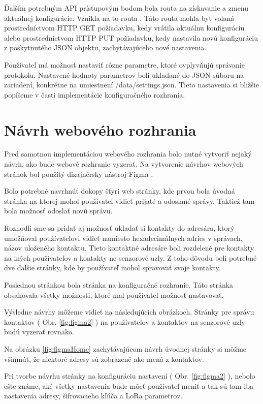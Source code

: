 \documentclass[slovak,master]{diploma}
\begin{document}
Ďalším potrebným API prístupovým bodom bola routa na získavanie a zmenu aktuálnej konfigurácie. 
Vznikla na to routa . Táto routa mohla byť volaná prostredníctvom HTTP GET požiadavku, kedy vrátila aktuálnu konfiguráciu 
alebo prostredníctvom HTTP PUT požiadavku, kedy nastavila novú konfiguráciu z poskytnutého JSON objektu, zachytávajúceho nové nastavenia.

Používateľ má možnosť nastaviť rôzne parametre, ktoré ovplyvňujú správanie protokolu. Nastavené hodnoty parametrov boli ukladané do 
JSON súboru na zariadení, konkrétne na umiestnení /data/settings.json. Tieto nastavenia si bližšie popíšeme v časti implementácie 
konfiguračného rozhrania.

\section{Návrh webového rozhrania}
Pred samotnou implementáciou webového rozhrania bolo nutné vytvoriť nejaký návrh, 
ako bude webové rozhranie vyzerať. Na vytvorenie návrhov webových stránok bol použitý dizajnérsky nástroj Figma \cite{figma}.

Bolo potrebné navrhnúť dokopy štyri web stránky, kde prvou bola úvodná stránka na ktorej mohol používateľ vidieť prijaté a odoslané správy. 
Taktiež tam bola možnosť odoslať novú správu.

Rozhodli sme sa pridať aj možnosť ukladať si kontakty do adresára, ktorý umožňoval používateľovi vidieť namiesto 
hexadecimálnych adries v správach, názov uloženého kontaktu. Tieto kontaktné adresáre boli rozdelené pre kontakty na iných používateľov a kontakty 
ne senzorové uzly. Z toho dôvodu boli potrebné dve ďalšie stránky, kde by používateľ mohol spravovať svoje kontakty.

Poslednou stránkou bola stránka na konfiguračné rozhranie. Táto stránka obsahovala všetky možnosti, ktoré mal používateľ možnosť nastavovať.

Výsledne návrhy môžeme vidieť na následujúcich obrázkoch. Stránky pre správu kontaktov ( Obr. \ref{fig:figma2} ) na používateľov a kontaktov na senzorové uzly budú vyzerať 
rovnako.

Na obrázku \ref{fig:figmaHome} zachytávajúcom návrh úvodnej stránky si môžme všimnúť, že niektoré adresy sú zobrazené ako mená z kontaktov.

Pri tvorbe návrhu stránky na konfiguráciu nastavení ( Obr. \ref{fig:figma2} ), nebolo ešte známe, aké všetky nastavenia 
bude môcť používateľ meniť a tak sú tam iba nastavenia adresy, šifrovacieho kľúča a LoRa parametrov.
\end{document}
